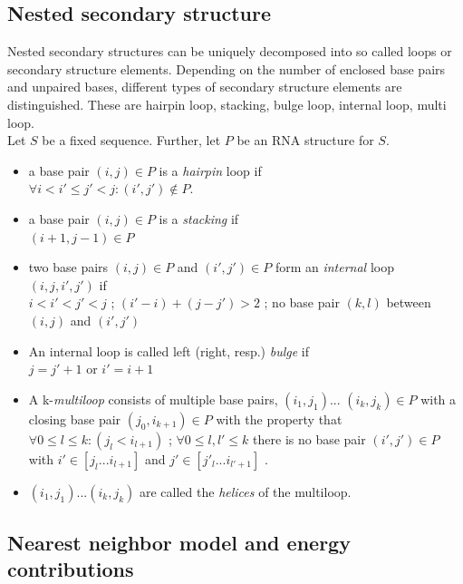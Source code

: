 \documentclass[twoside,a4paper]{report}
\begin{document}
	\subsection{Nested secondary structure}
	Nested secondary structures can be uniquely decomposed into so called loops or secondary structure elements. Depending on the number of enclosed base pairs  and unpaired bases, different types of secondary structure elements are distinguished. These are hairpin loop, stacking, bulge loop, internal loop, multi loop. \\
	Let $S$ be a fixed sequence. Further, let $P$ be an RNA structure for $S$.
	\begin{itemize}
		\item a base pair $( i, j ) \in P$ is a \textit{hairpin} loop if\\
			$	\forall i < i' \leq j' < j : (i', j') \notin P. $

		\item a base pair $( i, j ) \in P$ is a \textit{stacking} if\\
		$(i + 1 , j - 1 ) \in P $
		\item two base pairs $ (i, j) \in P$ and $(i' ,j' ) \in P$ form  an \textit{internal} loop $(i,j,i',j')$ if \\
		$i < i' < j' < j $ ; $ (i' - i)+( j - j') > 2$ ; no base pair $(k,l)$ between $(i, j)$ and $(i',j')$
		\item An internal loop is called left (right, resp.) \textit{bulge} if\\
		$ j = j' +1 $ or $ i' = i+1$
		\item A k-\textit{multiloop} consists of multiple base pairs, $(i_1,j_1)$... $(i_k,j_k) \in P$ with a closing base pair $(j_0, i_{k+1}) \in P$ with the property that \\
		$\forall 0 \leq l \leq k : ( j_l < i_{l+1})$ ; $\forall 0 \leq l , l' \leq k$  there is no base pair $(i' ,j') \in P$ with $i' \in [j_l...i_{l+1}]$ and $j' \in [j'_l...i_{l'+1}]$ .
		\item $(i_1,j_1)...(i_k, j_k)$ are called the \textit{helices} of the multiloop.\\
 	\end{itemize}
 

 	 
 	 \subsection{Nearest neighbor model and energy contributions }
 	 
\end{document}
